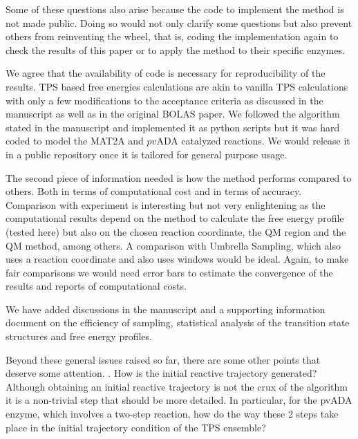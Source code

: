 \documentclass[journal=jpcbfk,manuscript=article,layout=traditional]{achemso}
\begin{document}
{\begin{response}{Some of these questions also arise because the 
code to implement the method is not made public. Doing so would 
not only clarify some questions but also prevent others from 
reinventing the wheel, that is, coding the implementation again 
to check the results of this paper or to apply the method to their specific enzymes.}

We agree that the availability of code is necessary for reproducibility of the results.
TPS based free energies calculations are akin to vanilla TPS calculations with 
only a few modifications to the acceptance criteria as discussed in the manuscript as well
as in the original BOLAS paper. We followed the algorithm stated in the manuscript
and implemented it as python scripts but it was hard coded to model the MAT2A and 
$\textit{pv}$ADA catalyzed reactions. We would release it in a public repository once it is 
tailored for general purpose usage.  
\end{response}

\begin{response}{The second piece of information needed is how the method 
performs compared to others. Both in terms of computational cost and in 
terms of accuracy. Comparison with experiment is interesting but not very 
enlightening as the computational results depend on the method to calculate 
the free energy profile (tested here) but also on the chosen reaction coordinate, 
the QM region and the QM method, among others. A comparison with Umbrella Sampling, 
which also uses a reaction coordinate and also uses windows would be ideal. Again, 
to make fair comparisons we would need error bars to estimate the convergence of 
the results and reports of computational costs.}

We have added discussions in the manuscript and a supporting information 
document on the efficiency of sampling, 
statistical analysis of the transition state structures and free energy profiles. 
\end{response}

\begin{response}{Beyond these general issues raised so far, there are some other points 
that deserve some attention.
. How is the initial reactive trajectory generated? Although obtaining an initial reactive 
trajectory is not the crux of the algorithm it is a non-trivial step that should be more 
detailed. In particular, for the pvADA enzyme, which involves a two-step reaction, how 
do the way these 2 steps take place in the initial trajectory condition of the TPS ensemble?}


\end{response}}
\end{document}
